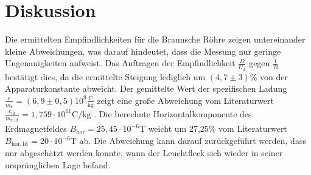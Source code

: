 \section{Diskussion}
\label{sec:Diskussion}
Die ermittelten Empfindlichkeiten für die Braunsche Röhre zeigen untereinander kleine Abweichungen, was darauf hindeutet, dass die Messung nur geringe Ungenauigkeiten aufweist.
Das Auftragen der Empfindlichkeit $\frac{D}{U_\mathrm{d}}$ gegen $\frac{1}{B}$ bestätigt dies, da die ermittelte Steigung lediglich um $(4,7 \pm3)\%$ von der Apparaturkonstante abweicht.
Der gemittelte Wert der spezifischen Ladung $\frac{e}{m_\mathrm{e}}=(6,9 \pm 0,5)10^9 \frac{\si{\coulomb}}{\si{\kilo\gram}}$ zeigt eine große Abweichung vom Literaturwert $\frac{e_\mathrm{lit}}{m_\mathrm{e, lit}}=1,759 \cdot 10^
{11} \si{\coulomb\per\kilo\gram}$ \cite{tafelwerk}.
Die  berechnte Horizontalkomponente des Erdmagnetfeldes $B_\mathrm{hor}=25,45 \cdot 10^{-6} \si{\tesla}$ weicht um 27,25\% vom Literaturwert $B_\mathrm{hor,lit}=20 \cdot 10^{-6} \si{\tesla}$ \cite{dornbader} ab. Die Abweichung kann darauf zurückgeführt werden, dass nur abgeschätzt werden konnte, wann der Leuchtfleck sich wieder in seiner ursprünglichen Lage befand.

